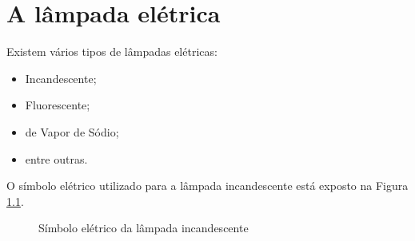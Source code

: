 \chapter{A lâmpada elétrica}
\label{sec:alampada}

Existem vários tipos de lâmpadas elétricas:
\begin{itemize}
\item Incandescente;
\item Fluorescente;
\item de Vapor de Sódio;
\item entre outras. %
\end{itemize}

O símbolo elétrico utilizado para a lâmpada incandescente está
exposto na Figura \ref{fig:simbolo_lampada}.

\begin{figure}[!htb]
\centering
{}
\caption{Símbolo elétrico da lâmpada incandescente}
\label{fig:simbolo_lampada}
\end{figure}
